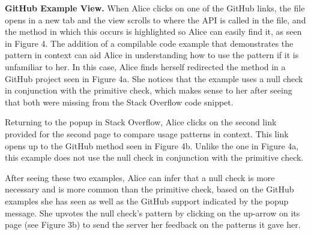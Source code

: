 {\bf GitHub Example View.} When Alice clicks on one of the GitHub links, the file opens in a new tab and the view scrolls to where the API is called in the file, and the method in which this occurs is highlighted so Alice can easily find it, as seen in Figure 4. The addition of a compilable code example that demonstrates the pattern in context can aid Alice in understanding how to use the pattern if it is unfamiliar to her. In this case, Alice finds herself redirected the method in a GitHub project seen in Figure 4a. She notices that the example uses a null check in conjunction with the primitive check, which makes sense to her after seeing that both were missing from the Stack Overflow code snippet.

Returning to the popup in Stack Overflow, Alice clicks on the second link provided for the second page to compare usage patterns in context. This link opens up to the GitHub method seen in Figure 4b. Unlike the one in Figure 4a, this example does not use the null check in conjunction with the primitive check. 

After seeing these two examples, Alice can infer that a null check is more necessary and is more common than the primitive check, based on the GitHub examples she has seen as well as the GitHub support indicated by the popup message. She upvotes the null check's pattern by clicking on the up-arrow on its page (see Figure 3b) to send the server her feedback on the patterns it gave her. 

